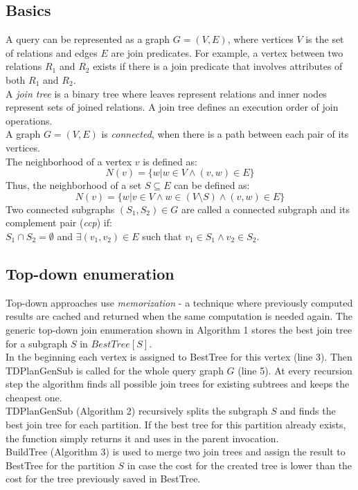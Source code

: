 \documentclass[10pt,journal,compsoc]{IEEEtran}
\begin{document}
\subsection{Basics}
\indent A query can be represented as a graph $G = (V, E)$, where vertices $V$ is the set of relations and edges $E$ are join predicates. For example, a vertex between two relations $R_1$ and $R_2$ exists if there is a join predicate that involves attributes of both $R_1$ and $R_2$. \\
\indent A \textit{join tree} is a binary tree where leaves represent relations and inner nodes represent sets of joined relations. A join tree defines an execution order of join operations. \\
\indent A graph $G = (V, E)$ is \textit{connected}, when there is a path between each pair of its vertices. \\
\indent The neighborhood of a vertex $v$ is defined as: $$N(v) = \{ w  |  w \in V \wedge (v, w) \in E\}$$
\indent Thus, the neighborhood of a set $S \subseteq E$ can be defined as:  $$N(v) = \{ w  |  v \in V \wedge w \in (V \setminus S) \wedge (v, w) \in E\}$$
\indent Two connected subgraphs $(S_1, S_2) \in G$ are called a connected subgraph and its complement pair (\textit{ccp}) if: \\
$S_1 \cap S_2 = \emptyset$ and $\exists (v_1, v_2) \in E$ such that $v_1 \in S_1 \wedge v_2 \in S_2$.

\subsection{Top-down enumeration}
\indent Top-down approaches use \textit{memorization} - a technique where previously computed results are cached and returned when the same computation is needed again. The generic top-down join enumeration \cite{FenderMCB} shown in Algorithm 1 stores the best join tree for a subgraph $S$ in $BestTree[S]$.\\
\indent In the beginning each vertex is assigned to BestTree for this vertex (line 3). Then TDPlanGenSub is called for the whole query graph $G$ (line 5). At every recursion step the algorithm finds all possible join trees for existing subtrees and keeps the cheapest one. \\
\indent TDPlanGenSub (Algorithm 2) recursively splits the subgraph $S$ and finds the best join tree for each partition. If the best tree for this partition already exists, the function simply returns it and uses in the parent invocation. \\
\indent BuildTree (Algorithm 3) is used to merge two join trees and assign the result to BestTree for the partition $S$ in case the cost for the created tree is lower than the cost for the tree previously saved in BestTree.
\end{document}
